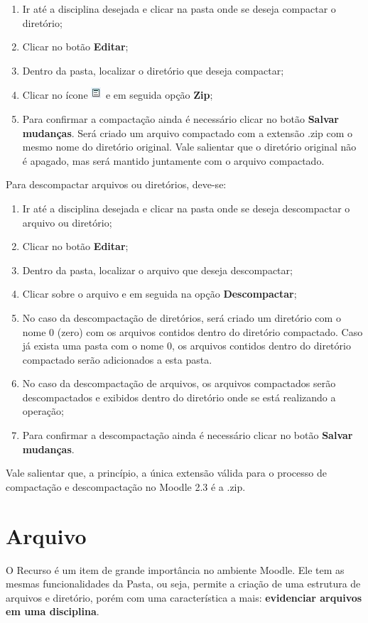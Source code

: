 \begin{enumerate}
\item Ir até a disciplina desejada e clicar na pasta onde se deseja compactar o diretório;
\item Clicar no botão \textbf{Editar};
\item Dentro da pasta, localizar o diretório que deseja compactar;
\item Clicar no ícone \includegraphics{imagem/cap4/fig21.jpg} e em seguida opção \textbf{Zip};
\item Para confirmar a compactação ainda é necessário clicar no botão \textbf{Salvar mudanças}. Será criado um arquivo compactado com a extensão .zip com o mesmo nome do diretório original. Vale salientar que o diretório original não é apagado, mas será mantido juntamente com o arquivo compactado.
\end{enumerate}
Para descompactar arquivos ou diretórios, deve-se:
\begin{enumerate}
\item Ir até a disciplina desejada e clicar na pasta onde se deseja descompactar o arquivo ou diretório;
\item Clicar no botão \textbf{Editar};
\item Dentro da pasta, localizar o arquivo que deseja descompactar;
\item Clicar sobre o arquivo e em seguida na opção \textbf{Descompactar};
\item No caso da descompactação de diretórios, será criado um diretório com o nome 0 (zero) com os arquivos contidos dentro do diretório compactado. Caso já exista uma pasta com o nome 0, os arquivos contidos dentro do diretório compactado serão adicionados a esta pasta.
\item No caso da descompactação de arquivos, os arquivos compactados serão descompactados e exibidos dentro do diretório onde se está realizando a operação;
\item Para confirmar a descompactação ainda é necessário clicar no botão \textbf{Salvar mudanças}.
\end{enumerate}
Vale salientar que, a princípio, a única extensão válida para o processo de compactação e descompactação no Moodle 2.3 é a .zip.

\section{Arquivo}
O Recurso é um item de grande importância no ambiente Moodle. Ele tem as mesmas funcionalidades da Pasta, ou seja, permite a criação de uma estrutura de arquivos e diretório, porém com uma característica a mais: \textbf{evidenciar arquivos em uma disciplina}.

